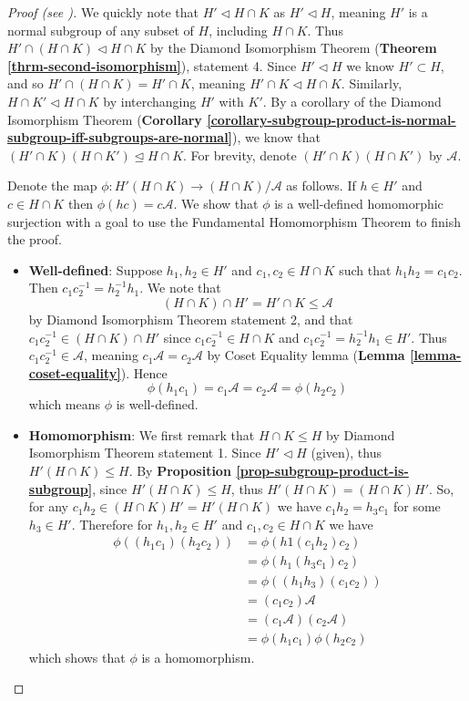 \begin{proof}[Proof (see {\cite[p.~110]{hungerford_1980}})]
    We quickly note that $H' \lhd H \cap K$ as $H' \lhd H$, meaning $H'$ is a normal subgroup of any subset of $H$, including $H \cap K$. Thus $H' \cap (H \cap K) \lhd H \cap K$ by the Diamond Isomorphism Theorem (\textbf{Theorem \ref{thrm-second-isomorphism}}), statement 4. Since $H'\lhd H$ we know $H' \subset H$, and so $H' \cap (H \cap K) = H' \cap K$, meaning $H' \cap K \lhd H \cap K$. Similarly, $H \cap K' \lhd H \cap K$ by interchanging $H'$ with $K'$. By a corollary of the Diamond Isomorphism Theorem (\textbf{Corollary \ref{corollary-subgroup-product-is-normal-subgroup-iff-subgroups-are-normal}}), we know that $(H' \cap K)(H \cap K') \unlhd H \cap K$. For brevity, denote $(H' \cap K)(H \cap K')$ by $\mathcal{A}$.
    
    Denote the map $\phi: H'(H\cap K) \to (H\cap K)/\mathcal{A}$ as follows. If $h \in H'$ and $c \in H \cap K$ then $\phi(hc) = c\mathcal{A}$. We show that $\phi$ is a well-defined homomorphic surjection with a goal to use the Fundamental Homomorphism Theorem to finish the proof.
    
    \begin{itemize}
        \item \textbf{Well-defined}: Suppose $h_1, h_2 \in H'$ and $c_1, c_2 \in H \cap K$ such that $h_1h_2 = c_1c_2$. Then $c_1c_2^{-1} = h_2^{-1}h_1$. We note that
        \[
            (H \cap K) \cap H' = H' \cap K \leq \mathcal{A}    
        \]
        by Diamond Isomorphism Theorem statement 2, and that $c_1c_2^{-1} \in (H \cap K) \cap H'$ since $c_1c_2^{-1} \in H \cap K$ and $c_1c_2^{-1} = h_2^{-1}h_1 \in H'$. Thus $c_1c_2^{-1} \in \mathcal{A}$, meaning $c_1\mathcal{A} = c_2\mathcal{A}$ by Coset Equality lemma (\textbf{Lemma \ref{lemma-coset-equality}}). Hence
        \[
            \phi(h_1c_1) = c_1\mathcal{A} = c_2\mathcal{A} = \phi(h_2c_2)        
        \]
        which means $\phi$ is well-defined.
        
        \item \textbf{Homomorphism}: We first remark that $H \cap K \leq H$ by Diamond Isomorphism Theorem statement 1. Since $H' \lhd H$ (given), thus $H'(H\cap K) \leq H$. By \textbf{Proposition \ref{prop-subgroup-product-is-subgroup}}, since $H'(H\cap K) \leq H$, thus $H'(H\cap K) = (H\cap K)H'$. So, for any $c_1h_2 \in (H\cap K)H' = H'(H\cap K)$ we have $c_1h_2 = h_3c_1$ for some $h_3 \in H'$. Therefore for $h_1, h_2 \in H'$ and $c_1, c_2 \in H \cap K$ we have
        \begin{align*}
            \phi((h_1c_1)(h_2c_2)) &= \phi(h1(c_1h_2)c_2)\\
            &= \phi(h_1(h_3c_1)c_2)\\
            &= \phi((h_1h_3)(c_1c_2))\\
            &= (c_1c_2)\mathcal{A}\\
            &= (c_1\mathcal{A})(c_2\mathcal{A})\\
            &= \phi(h_1c_1)\phi(h_2c_2)
        \end{align*}
        which shows that $\phi$ is a homomorphism.
        

\end{itemize}
\end{proof}

